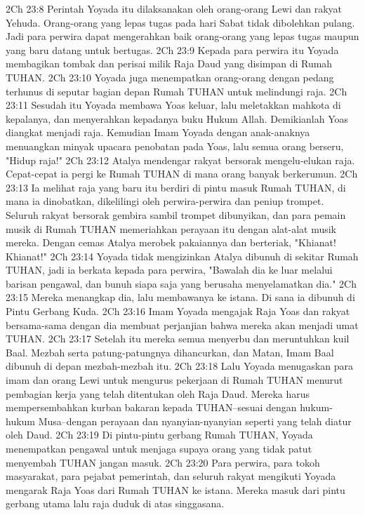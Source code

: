 2Ch 23:8  Perintah Yoyada itu dilaksanakan oleh orang-orang Lewi dan rakyat Yehuda. Orang-orang yang lepas tugas pada hari Sabat tidak dibolehkan pulang. Jadi para perwira dapat mengerahkan baik orang-orang yang lepas tugas maupun yang baru datang untuk bertugas.
2Ch 23:9  Kepada para perwira itu Yoyada membagikan tombak dan perisai milik Raja Daud yang disimpan di Rumah TUHAN.
2Ch 23:10  Yoyada juga menempatkan orang-orang dengan pedang terhunus di seputar bagian depan Rumah TUHAN untuk melindungi raja.
2Ch 23:11  Sesudah itu Yoyada membawa Yoas keluar, lalu meletakkan mahkota di kepalanya, dan menyerahkan kepadanya buku Hukum Allah. Demikianlah Yoas diangkat menjadi raja. Kemudian Imam Yoyada dengan anak-anaknya menuangkan minyak upacara penobatan pada Yoas, lalu semua orang berseru, "Hidup raja!"
2Ch 23:12  Atalya mendengar rakyat bersorak mengelu-elukan raja. Cepat-cepat ia pergi ke Rumah TUHAN di mana orang banyak berkerumun.
2Ch 23:13  Ia melihat raja yang baru itu berdiri di pintu masuk Rumah TUHAN, di mana ia dinobatkan, dikelilingi oleh perwira-perwira dan peniup trompet. Seluruh rakyat bersorak gembira sambil trompet dibunyikan, dan para pemain musik di Rumah TUHAN memeriahkan perayaan itu dengan alat-alat musik mereka. Dengan cemas Atalya merobek pakaiannya dan berteriak, "Khianat! Khianat!"
2Ch 23:14  Yoyada tidak mengizinkan Atalya dibunuh di sekitar Rumah TUHAN, jadi ia berkata kepada para perwira, "Bawalah dia ke luar melalui barisan pengawal, dan bunuh siapa saja yang berusaha menyelamatkan dia."
2Ch 23:15  Mereka menangkap dia, lalu membawanya ke istana. Di sana ia dibunuh di Pintu Gerbang Kuda.
2Ch 23:16  Imam Yoyada mengajak Raja Yoas dan rakyat bersama-sama dengan dia membuat perjanjian bahwa mereka akan menjadi umat TUHAN.
2Ch 23:17  Setelah itu mereka semua menyerbu dan meruntuhkan kuil Baal. Mezbah serta patung-patungnya dihancurkan, dan Matan, Imam Baal dibunuh di depan mezbah-mezbah itu.
2Ch 23:18  Lalu Yoyada menugaskan para imam dan orang Lewi untuk mengurus pekerjaan di Rumah TUHAN menurut pembagian kerja yang telah ditentukan oleh Raja Daud. Mereka harus mempersembahkan kurban bakaran kepada TUHAN--sesuai dengan hukum-hukum Musa--dengan perayaan dan nyanyian-nyanyian seperti yang telah diatur oleh Daud.
2Ch 23:19  Di pintu-pintu gerbang Rumah TUHAN, Yoyada menempatkan pengawal untuk menjaga supaya orang yang tidak patut menyembah TUHAN jangan masuk.
2Ch 23:20  Para perwira, para tokoh masyarakat, para pejabat pemerintah, dan seluruh rakyat mengikuti Yoyada mengarak Raja Yoas dari Rumah TUHAN ke istana. Mereka masuk dari pintu gerbang utama lalu raja duduk di atas singgasana.
